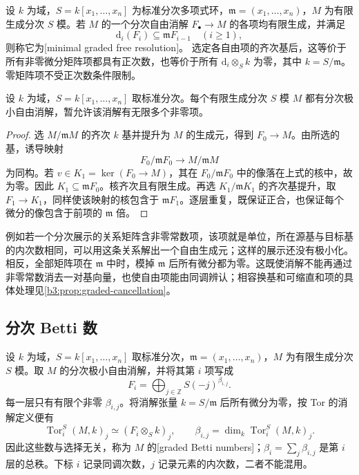 \begin{definition}\label{b3:def:graded-minimal-resolution}
	设 \(k\) 为域，\(S=k[x_1,\ldots,x_n]\) 为标准分次多项式环，\(\mathfrak m=(x_1,\ldots,x_n)\)，\(M\) 为有限生成分次 \(S\) 模。若 \(M\) 的一个分次自由消解 \(F_\bullet\to M\) 的各项均有限生成，并满足
	\[
		\mathrm{d}_i(F_i)\subseteq\mathfrak mF_{i-1}\quad(i\ge1),
	\]
	则称它为[minimal graded free resolution]。 选定各自由项的齐次基后，这等价于所有非零微分矩阵项都具有正次数，也等价于所有 \(\mathrm{d}_i\otimes_Sk\) 为零，其中 \(k=S/\mathfrak m\)。零矩阵项不受正次数条件限制。
\end{definition}

\begin{proposition}\label{b3:prop:graded-minimal-existence}
	设 \(k\) 为域，\(S=k[x_1,\ldots,x_n]\) 取标准分次。每个有限生成分次 \(S\) 模 \(M\) 都有分次极小自由消解，暂允许该消解有无限多个非零项。
\end{proposition}
\begin{proof}
	选 \(M/\mathfrak mM\) 的齐次 \(k\) 基并提升为 \(M\) 的生成元，得到 \(F_0\rightarrow M\)。由所选的基，诱导映射
	\[
		F_0/\mathfrak mF_0\longrightarrow M/\mathfrak mM
	\]
	为同构。若 \(v\in K_1=\ker(F_0\to M)\)，其在 \(F_0/\mathfrak mF_0\) 中的像落在上式的核中，故为零。因此 \(K_1\subseteq\mathfrak mF_0\)。核齐次且有限生成。再选 \(K_1/\mathfrak mK_1\) 的齐次基提升，取 \(F_1\rightarrow K_1\)，同样使该映射的核包含于 \(\mathfrak mF_1\)。逐层重复，既保证正合，也保证每个微分的像包含于前项的 \(\mathfrak m\) 倍。
\end{proof}

例如若一个分次展示的关系矩阵含非零常数项，该项就是单位，所在源基与目标基的内次数相同，可以用这条关系解出一个自由生成元；这样的展示还没有极小化。相反，全部矩阵项在 \(\mathfrak m\) 中时，模掉 \(\mathfrak m\) 后所有微分都为零。这既使消解不能再通过非零常数消去一对基向量，也使自由项能由同调辨认；相容换基和可缩直和项的具体处理见\cref{b3:prop:graded-cancellation}。

\subsection{分次 Betti 数}
\label{b3:subsec:2101:03}

设 \(k\) 为域，\(S=k[x_1,\ldots,x_n]\) 取标准分次，\(\mathfrak m=(x_1,\ldots,x_n)\)，\(M\) 为有限生成分次 \(S\) 模。取 \(M\) 的分次极小自由消解，并将其第 \(i\) 项写成
\[
	F_i=\bigoplus_{j\in\mathbb Z}S(-j)^{\beta_{i,j}}.
\]
每一层只有有限个非零 \(\beta_{i,j}\)。将消解张量 \(k=S/\mathfrak m\) 后所有微分为零，按 Tor 的消解定义便有
\begin{equation}\label{b3:eq:graded-betti-tor}
	\operatorname{Tor}_i^S(M,k)_j\simeq (F_i\otimes_Sk)_j, \qquad\beta_{i,j}=\dim_k\operatorname{Tor}_i^S(M,k)_j.
\end{equation}
因此这些数与选择无关，称为 \(M\) 的[graded Betti numbers]；\(\beta_i=\sum_j\beta_{i,j}\) 是第 \(i\) 层的总秩。下标 \(i\) 记录同调次数，\(j\) 记录元素的内次数，二者不能混用。

